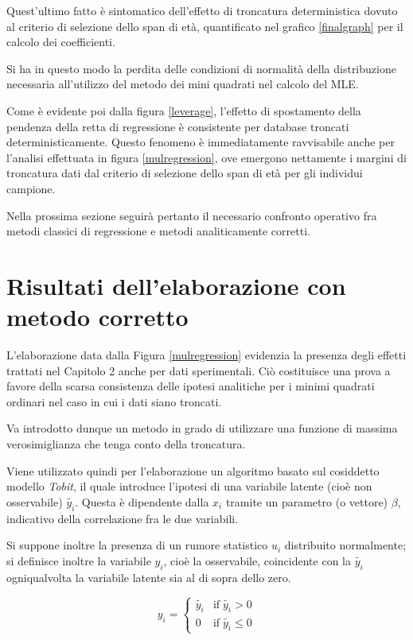 \documentclass[12pt,openright,twoside,a4paper]{book}
\begin{document}
Quest'ultimo fatto è sintomatico dell'effetto di troncatura deterministica dovuto al criterio di selezione dello span di età, quantificato nel grafico \ref{finalgraph} per il calcolo dei coefficienti.

Si ha in questo modo la perdita delle condizioni di normalità della distribuzione necessaria all'utilizzo del metodo dei mini quadrati nel calcolo del MLE.

Come è evidente poi dalla figura \ref{leverage}, l'effetto di spostamento della pendenza della retta di regressione è consistente per database troncati deterministicamente.
Questo fenomeno è immediatamente ravvisabile anche per l'analisi effettuata in figura \ref{mulregression}, ove emergono nettamente i margini di troncatura dati dal criterio di selezione dello span di età per gli individui campione.

Nella prossima sezione seguirà pertanto il necessario confronto operativo fra metodi classici di regressione e metodi analiticamente corretti.

\section{Risultati dell'elaborazione con metodo corretto}

L'elaborazione data dalla Figura \ref{mulregression} evidenzia la presenza degli effetti trattati nel Capitolo 2 anche per dati sperimentali.
Ciò costituisce una prova a favore della scarsa consistenza delle ipotesi analitiche per i minimi quadrati ordinari nel caso in cui i dati siano troncati.

Va introdotto dunque un metodo in grado di utilizzare una funzione di massima verosimiglianza che tenga conto della troncatura.

Viene utilizzato quindi per l'elaborazione un algoritmo basato sul cosiddetto modello \textit{Tobit}, il quale introduce l'ipotesi di una variabile latente (cioè non osservabile) $\tilde{y_i}$.
Questa è dipendente dalla $x_i$ tramite un parametro (o vettore) $\beta$, indicativo della correlazione fra le due variabili.

Si suppone inoltre la presenza di un rumore statistico $u_i$ distribuito normalmente; si definisce inoltre la variabile $y_i$, cioè la osservabile, coincidente con la $\tilde{y_i}$ ogniqualvolta la variabile latente sia al di sopra dello zero.

\begin{equation}
y_i = \begin{cases}
    \tilde{y_i} & \textrm{if} \; \tilde{y_i} >0 \\
    0     & \textrm{if} \; \tilde{y_i} \leq 0
\end{cases}
\end{equation}
\end{document}
